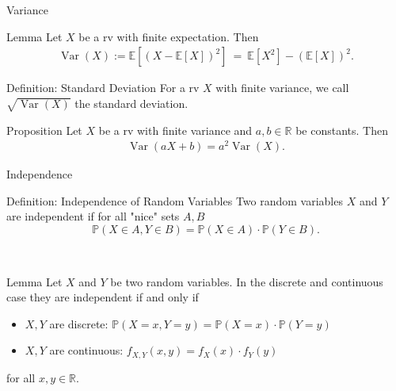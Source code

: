 \documentclass[11pt,pdf,ngerman,UKenglish]{beamer}%
\newcommand{\IR}{\mathds{R}}
\newcommand{\IP}{\mathbb{P}}
\newcommand{\IE}{{\mathbb{E}}}
\newcommand{\1}{\mathbb{1}}
\newcommand{\Var}{\operatorname{Var}}
\newcommand{\var}{\operatorname{Var}}
\theoremstyle{thm}
\theoremstyle{def}
\begin{document}
\begin{frame}{Variance}
\begin{block}{Lemma}
Let $X$ be a rv with finite expectation. Then
\begin{align*}
\Var(X) := \IE\left[ \left( X - \IE[X] \right)^2 \right]
\ = \ \IE\left[ X^2 \right] - (\IE[X])^2.
\end{align*}
\end{block}
\begin{block}{Definition: Standard Deviation}
For a rv $X$ with finite variance, we call $\sqrt{ \var(X)}$ the standard deviation.
\end{block}
\begin{block}{Proposition}
Let $X$ be a rv with finite variance and $a,b\in \IR$ be constants. Then
\begin{align*}
\Var(aX+b) = a^2 \Var(X).
\end{align*}
\end{block}
\end{frame}


\begin{frame}{Independence}
\begin{block}{Definition: Independence of Random Variables}
Two random variables $X$ and $Y$ are independent if for all "nice" sets $A,B$
$$ \IP( X \in A, Y \in B) = \IP(X \in A) \cdot \IP(Y \in B).$$
\end{block}
\
\begin{block}{Lemma}
Let $X$ and $Y$ be two random variables. In the discrete and continuous case they are independent if and only if
\begin{itemize}
\item $X,Y$ are discrete: $\IP(X=x,Y=y) = \IP(X=x) \cdot \IP(Y=y)$%
\item $X,Y$ are continuous: $f_{X,Y}(x,y) = f_X(x) \cdot f_Y(y)$
\end{itemize}
for all $x,y\in \IR$.
\end{block}
\vfill
\end{frame}
\end{document}
